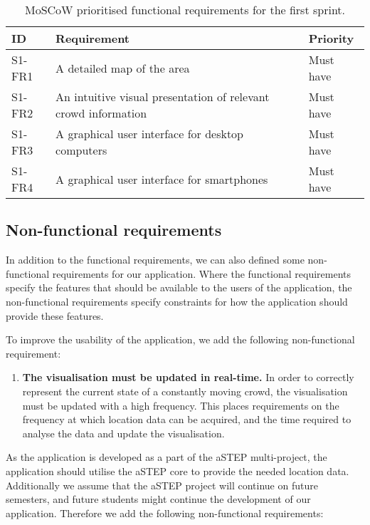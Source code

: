 \begin{table}[h!]
	\centering
	\begin{tabularx}{\textwidth}{lXl}
		\toprule
		\textbf{ID} & \textbf{Requirement} & \textbf{Priority} \\
		\midrule 
		\rowcolor[HTML]{EFEFEF} 
		S1-FR1 & A detailed map of the area & Must have \\
		S1-FR2 & An intuitive visual presentation of relevant crowd information & Must have \\
		\rowcolor[HTML]{EFEFEF} 
		S1-FR3 & A graphical user interface for desktop computers & Must have \\
		S1-FR4 & A graphical user interface for smartphones & Must have \\
		\bottomrule
	\end{tabularx}
	\caption{MoSCoW prioritised functional requirements for the first sprint.}
	\label{tab:s1_req}
\end{table}

\subsection{Non-functional requirements}
In addition to the functional requirements, we can also defined some non-functional requirements for our application. Where the functional requirements specify the features that should be available to the users of the application, the non-functional requirements specify constraints for how the application should provide these features.

To improve the usability of the application, we add the following non-functional requirement:

\begin{enumerate}
    \item \textbf{The visualisation must be updated in real-time.} In order to correctly represent the current state of a constantly moving crowd, the visualisation must be updated with a high frequency. This places requirements on the frequency at which location data can be acquired, and the time required to analyse the data and update the visualisation.
\end{enumerate}

As the application is developed as a part of the aSTEP multi-project, the application should utilise the aSTEP core to provide the needed location data. Additionally we assume that the aSTEP project will continue on future semesters, and future students might continue the development of our application. Therefore we add the following non-functional requirements:

